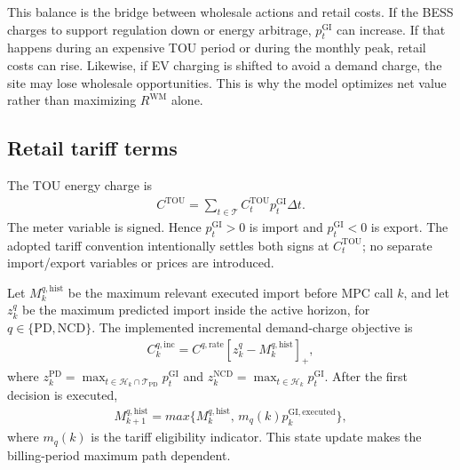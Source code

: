 \documentclass[final,5p,times]{elsarticle}
\newcommand{\DeltaT}{\Delta t}
\newcommand{\GI}{\mathrm{GI}}
\newcommand{\TOU}{\mathrm{TOU}}
\newcommand{\PD}{\mathrm{PD}}
\newcommand{\NCD}{\mathrm{NCD}}
\newcommand{\WM}{\mathrm{WM}}
\newcommand{\executed}{\mathrm{executed}}
\newcommand{\calH}{\mathcal{H}}
\newcommand{\calT}{\mathcal{T}}
\newcommand{\pos}[1]{\left[#1\right]_+}
\begin{document}
This balance is the bridge between wholesale actions and retail costs. If the BESS charges to support regulation down or energy arbitrage, $p_t^{\GI}$ can increase. If that happens during an expensive TOU period or during the monthly peak, retail costs can rise. Likewise, if EV charging is shifted to avoid a demand charge, the site may lose wholesale opportunities. This is why the model optimizes net value rather than maximizing $R^{\WM}$ alone.

\subsection{Retail tariff terms}
The TOU energy charge is
\begin{align}
C^{\TOU}=\sum_{t\in\calT} C_t^{\TOU}p_t^{\GI}\DeltaT.
\label{eq:tou_main}
\end{align}
The meter variable is signed. Hence $p_t^{\GI}>0$ is import and $p_t^{\GI}<0$ is export. The adopted tariff convention intentionally settles both signs at $C_t^{\TOU}$; no separate import/export variables or prices are introduced.

Let $M_k^{q,\mathrm{hist}}$ be the maximum relevant executed import before MPC call $k$, and let $z_k^q$ be the maximum predicted import inside the active horizon, for $q\in\{\PD,\NCD\}$. The implemented incremental demand-charge objective is
\begin{align}
C_k^{q,\mathrm{inc}}=C^{q,\mathrm{rate}}\pos{z_k^q-M_k^{q,\mathrm{hist}}},
\label{eq:demand_charge_main}
\end{align}
where $z_k^{\PD}=\max_{t\in\calH_k\cap\calT_{\PD}}p_t^{\GI}$ and $z_k^{\NCD}=\max_{t\in\calH_k}p_t^{\GI}$. After the first decision is executed,
\begin{align}
M_{k+1}^{q,\mathrm{hist}}=max\{M_k^{q,\mathrm{hist}},\,m_q(k)p_k^{\GI,\executed}\},
\label{eq:threshold_update}
\end{align}
where $m_q(k)$ is the tariff eligibility indicator. This state update makes the billing-period maximum path dependent.
\end{document}
